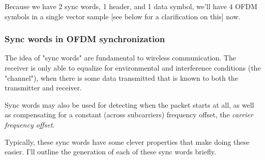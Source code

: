 \documentclass[11pt]{article}
\begin{document}
Because we have 2 sync words, 1 header, and 1 data symbol, we'll have
4 OFDM symbols in a single vector sample [see below for a
clarification on this] now.

\subsubsection{Sync words in OFDM synchronization}
\label{sec:org20a85f2}
The idea of "sync words" are fundamental to wireless
communication. The receiver is only able to equalize for environmental
and interference conditions (the "channel"), when there is some data
transmitted that is known to both the transmitter and receiver.

Sync words may also be used for detecting when the packet starts at
all, as well as compensating for a constant (across subcarriers)
frequency offset, the \emph{carrier frequency offset}.

Typically, these sync words have some clever properties that make
doing these easier. I'll outline the generation of each of these sync
words briefly.
\end{document}
